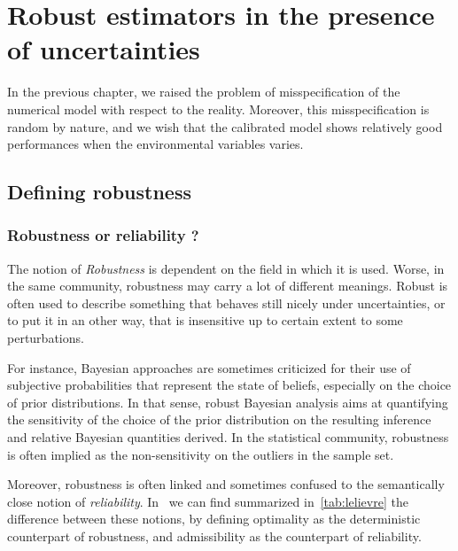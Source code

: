\documentclass[../../Main_ManuscritThese.tex]{subfiles}
\begin{document}
\chapter{Robust estimators in the presence of uncertainties} 
\label{chap:robust_estimators}

\minitoc
\newpage
\subfileLocal{\pagestyle{contentStyle}}
In the previous chapter, we raised the problem of misspecification of the numerical model with respect to the reality. Moreover, this misspecification is random by nature, and we wish that the calibrated model shows relatively good performances when the environmental variables varies.
\begin{figure}[ht]
  \begin{center}
  \resizebox{\linewidth}{!}
  {
      
    }
    \end{center}
  \caption{\label{fig:label} }
\end{figure}


\section{Defining robustness}
\subsection{Robustness or reliability ?}


The notion of \emph{Robustness} is dependent on the field in which it is used. Worse, in the same community, robustness may carry a lot of different meanings. Robust is often used to describe something that behaves still nicely under uncertainties, or to put it in an other way, that is insensitive up to certain extent to some perturbations.

For instance, Bayesian approaches are sometimes criticized for their use of subjective probabilities that represent the state of beliefs, especially on the choice of prior distributions. In that sense, robust Bayesian analysis aims at quantifying the sensitivity of the choice of the prior distribution on the resulting inference and relative Bayesian quantities derived. In the statistical community, robustness is often implied as the non-sensitivity on the outliers in the sample set.

Moreover, robustness is often linked and sometimes confused to the semantically close notion of \emph{reliability}. In~\cite{lelievre_consideration_2016} we can find summarized in~\cref{tab:lelievre} the difference between these notions,  by defining optimality as the deterministic counterpart of robustness, and admissibility as the counterpart of reliability.
\end{document}
